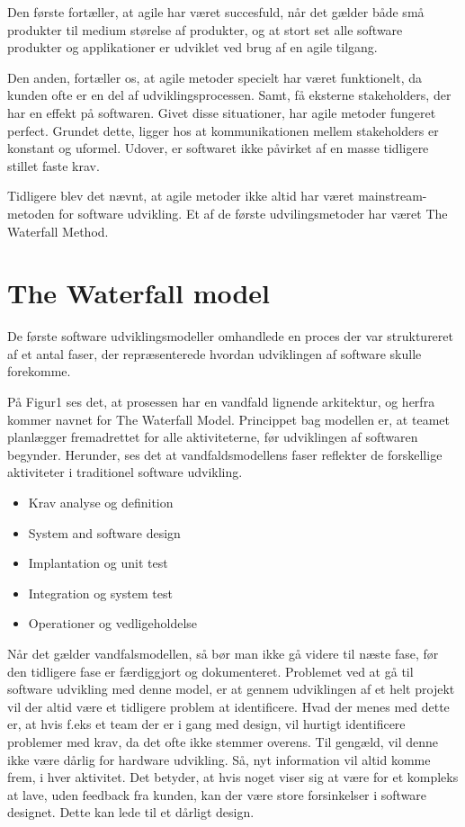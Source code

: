 Den første fortæller, at agile har været succesfuld, når det gælder både små produkter til medium størelse af produkter, og at stort set alle software produkter og applikationer er udviklet ved brug af en agile tilgang. 

Den anden, fortæller os, at agile metoder specielt har været funktionelt, da kunden ofte er  en del af udviklingsprocessen. Samt, få eksterne stakeholders, der har en effekt på softwaren. \cite{Sommerville}
Givet disse situationer, har agile metoder fungeret perfect. Grundet dette, ligger hos at kommunikationen mellem stakeholders er konstant og uformel. Udover, er softwaret ikke påvirket af en masse tidligere stillet faste krav. 

Tidligere blev det nævnt, at agile metoder ikke altid har været mainstream-metoden for software udvikling. Et af de første udvilingsmetoder har været The Waterfall Method.

\section{The Waterfall model}
De første software udviklingsmodeller omhandlede en proces der var struktureret af et antal faser, der repræsenterede hvordan udviklingen af software skulle forekomme. \cite{Sommerville}



På Figur1 ses det, at prosessen har en vandfald lignende arkitektur, og herfra kommer navnet for The Waterfall Model. Princippet bag modellen er, at teamet planlægger fremadrettet for alle aktiviteterne, før udviklingen af softwaren begynder. Herunder, ses det at vandfaldsmodellens faser reflekter de forskellige aktiviteter i traditionel software udvikling. \cite{Sommerville}
\begin{itemize}
    \item Krav analyse og definition 
    \item System and software design
    \item Implantation og unit test
    \item Integration og system test 
    \item Operationer og vedligeholdelse 
\end{itemize}

Når det gælder vandfalsmodellen, så bør man ikke gå videre til næste fase, før den tidligere fase er færdiggjort og dokumenteret. Problemet ved at gå til software udvikling med denne model, er at gennem udviklingen af et helt projekt vil der altid være et tidligere problem at identificere. Hvad der menes med dette er, at hvis f.eks et team der er i gang med design, vil hurtigt identificere problemer med krav, da det ofte ikke stemmer overens. Til gengæld, vil denne ikke være dårlig for hardware udvikling. Så, nyt information vil altid komme frem, i hver aktivitet. Det betyder, at hvis noget viser sig at være for et kompleks at lave, uden feedback fra kunden, kan der være store forsinkelser i software designet. Dette kan lede til et dårligt design. \cite{Sommerville}

